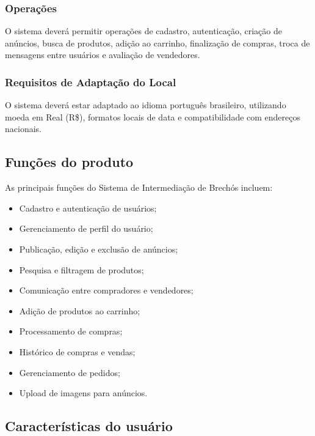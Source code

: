 ﻿\documentclass[12pt,a4paper]{article}
\begin{document}
\subsubsection{Operações}
\label{sec:Operacoes}

O sistema deverá permitir operações de cadastro, autenticação, criação de anúncios, busca de produtos, adição ao carrinho, finalização de compras, troca de mensagens entre usuários e avaliação de vendedores.

\subsubsection{Requisitos de Adaptação do Local}
\label{sec:RequisitosLocal}

O sistema deverá estar adaptado ao idioma português brasileiro, utilizando moeda em Real (R\$), formatos locais de data e compatibilidade com endereços nacionais.

\subsection{Funções do produto}
\label{sec:FuncoesProduto}

As principais funções do Sistema de Intermediação de Brechós incluem:

\begin{itemize}
    \item Cadastro e autenticação de usuários;
    \item Gerenciamento de perfil do usuário;
    \item Publicação, edição e exclusão de anúncios;
    \item Pesquisa e filtragem de produtos;
    \item Comunicação entre compradores e vendedores;
    \item Adição de produtos ao carrinho;
    \item Processamento de compras;
    \item Histórico de compras e vendas;
    \item Gerenciamento de pedidos;
    \item Upload de imagens para anúncios.
\end{itemize}

\subsection{Características do usuário}
\label{sec:CaracteristicasUsuario}
\end{document}
